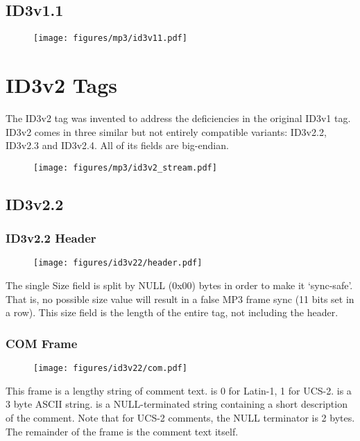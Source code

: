 \subsection{ID3v1.1}

\begin{figure}[h]
\texttt{[image: figures/mp3/id3v11.pdf]}
\end{figure}

\clearpage

\section{ID3v2 Tags}

The ID3v2 tag was invented to address the deficiencies in the original
ID3v1 tag.
ID3v2 comes in three similar but not entirely compatible variants:
ID3v2.2, ID3v2.3 and ID3v2.4.
All of its fields are big-endian.

\begin{figure}[h]
\texttt{[image: figures/mp3/id3v2\_stream.pdf]}
\end{figure}

\subsection{ID3v2.2}

\subsubsection{ID3v2.2 Header}

\begin{figure}[h]
\texttt{[image: figures/id3v22/header.pdf]}
\end{figure}
\par
\noindent
The single Size field is split by NULL (0x00) bytes in order to make
it `sync-safe'.
That is, no possible size value will result in a false
MP3 frame sync (11 bits set in a row).
This size field is the length of the entire tag, not including the header.

\subsubsection{COM Frame}
\begin{figure}[h]
\texttt{[image: figures/id3v22/com.pdf]}
\end{figure}
This frame is a lengthy string of comment text.
 is 0 for Latin-1, 1 for UCS-2.
 is a 3 byte ASCII string.
 is a NULL-terminated string
containing a short description of the comment.
Note that for UCS-2 comments, the NULL terminator is 2 bytes.
The remainder of the frame is the comment text itself.

